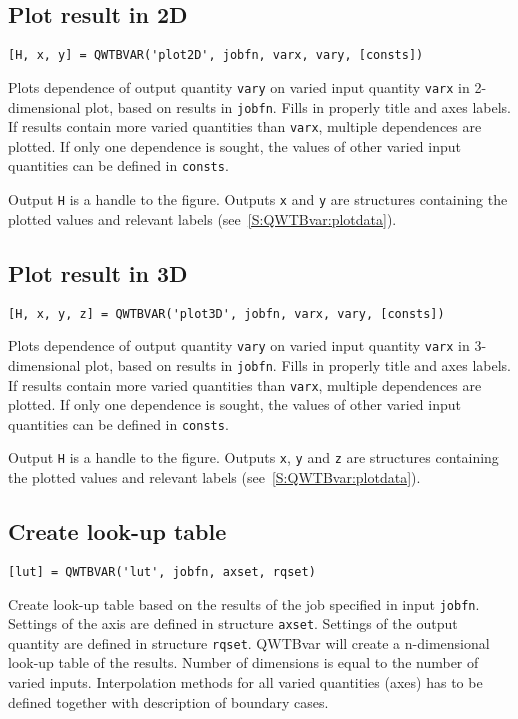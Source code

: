 \documentclass[12pt,a4paper,oneside]{report} %
\newcommand{\li}[1]{\lstinline{#1}}     %
\begin{document}
\subsection{Plot result in 2D}
\label{S:QWTBvar:plot2D}
\begin{lstlisting}
[H, x, y] = QWTBVAR('plot2D', jobfn, varx, vary, [consts])
\end{lstlisting}
Plots dependence of output quantity \li{vary} on varied input quantity
\li{varx} in 2-dimensional plot, based on results in \li{jobfn}.
Fills in properly title and axes labels. If results contain more varied
quantities than \li{varx}, multiple dependences are plotted.
If only one dependence is sought, the values of other varied input quantities
can be defined in \li{consts}.

Output \li{H} is a handle to the figure. Outputs \li{x} and \li{y} are
structures containing the plotted values and relevant labels
(see~\ref{S:QWTBvar:plotdata}).

\subsection{Plot result in 3D}
\label{S:QWTBvar:plot3D}
\begin{lstlisting}
[H, x, y, z] = QWTBVAR('plot3D', jobfn, varx, vary, [consts])
\end{lstlisting}
Plots dependence of output quantity \li{vary} on varied input quantity
\li{varx} in 3-dimensional plot, based on results in \li{jobfn}.
Fills in properly title and axes labels. If results contain more varied
quantities than \li{varx}, multiple dependences are plotted.
If only one dependence is sought, the values of other varied input quantities
can be defined in \li{consts}.

Output \li{H} is a handle to the figure. Outputs \li{x}, \li{y} and \li{z} are
structures containing the plotted values and relevant labels
(see~\ref{S:QWTBvar:plotdata}).


\subsection{Create look-up table}
\label{S:QWTBvar:lut}
\begin{lstlisting}
[lut] = QWTBVAR('lut', jobfn, axset, rqset)
\end{lstlisting}
Create look-up table based on the results of the job specified in input
\li{jobfn}.
Settings of the axis are defined in structure \li{axset}.
Settings of the output quantity are defined in structure \li{rqset}.
QWTBvar will create a n-dimensional look-up table of the results. Number of
dimensions is equal to the number of varied inputs. Interpolation methods for
all varied quantities (axes) has to be defined together with description of
boundary cases.
\end{document}
